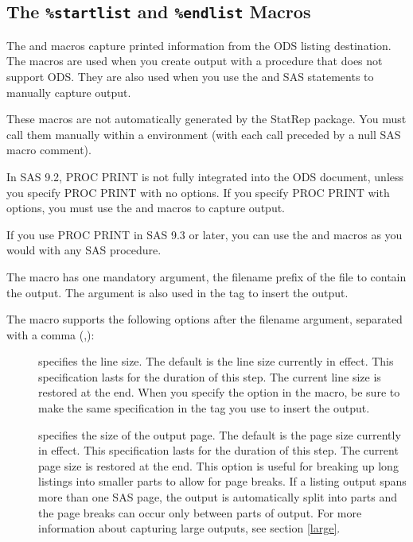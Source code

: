 \documentclass[article,oneside]{memoir}
\newcommand*{\StatRep}{\textsf{StatRep}\xspace}
\begin{document}
 \subsection{The \texttt{\%startlist} and \texttt{\%endlist} Macros}\label{startlist}
 
  The  and  macros capture printed information 
  from the ODS listing destination. The macros are used when 
  you create output with a procedure that does not support ODS. 
  They are also used when you use the 
   and  SAS statements to
  manually capture output.
 
  These macros are not automatically generated by the \StatRep package.
  You must call them
  manually within a  environment (with each call preceded
  by a null SAS macro comment).
  
  In SAS 9.2, PROC PRINT is not fully integrated into the ODS document, 
  unless you specify PROC PRINT with no options. 
  If you specify PROC PRINT
  with options, you must use the  and  
  macros to capture output.
  
  If you use PROC PRINT in SAS 9.3 or later, 
  you can use the  and  macros as you would with 
  any SAS procedure. 
  
  The  macro has one mandatory argument, the filename prefix
  of the file to contain
  the output. The argument is also used
  in the  tag to insert the output.
  
  The  macro supports the following options after
  the filename argument, separated with a comma (,):
  \begin{description}
  \item[] specifies the line size. 
  The default is the line size currently in effect. 
  This specification lasts for the duration of this step. 
  The current line size is restored at the end.
  When you specify the  option in the  
  macro, be sure to make the same specification
  in the  tag you use to insert the output.
  
  \item[] specifies the size of the output page.
   The default is the page size currently in effect. 
   This specification lasts for the duration of this step. 
  The current page size is restored at the end.
  This option is useful for breaking up long listings into smaller parts to allow for page breaks.
  If a listing output spans more than one SAS page, 
  the output is automatically split into parts and the page breaks
  can occur only between parts of output. 
  For more information about capturing large outputs, see section \ref{large}.
  \end{description}
  
\end{document}
